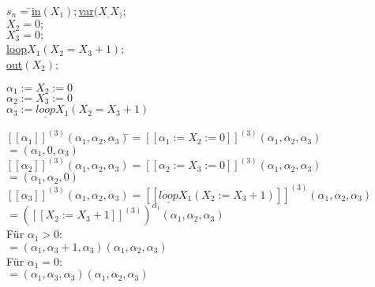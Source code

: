 \documentclass[11pt]{amsart}
\begin{document}
\begin{tabbing}
  $s_n = $\=$ $\underline{in}$ (X_1); $\underline{var}$(X_,X_);$ \\
  \>$ X_2 = 0;$ \\
  \>$ X_3 = 0;$ \\
  \>$ $\underline{loop}$ X_1(X_2 = X_3 + 1);$ \\
  \>$ $\underline{out}$ (X_2);$
\end{tabbing}
\vspace{0.5cm}
$\alpha_1 := X_2 := 0$ \\
$\alpha_2 := X_3 := 0$ \\
$\alpha_3 := \underline{loop} X_1(X_2 = X_3 + 1)$ \\
\begin{tabbing}

$[[\alpha_1]]^{(3)}(\alpha_1,\alpha_2,\alpha_3)$\=$ = [[\alpha_1 := X_2 := 0]]^{(3)}(\alpha_1,\alpha_2,\alpha_3)$ \\
$ $\>$   = (\alpha_1,0,\alpha_3)$ \\[0.3cm]
$[[\alpha_2]]^{(3)}(\alpha_1,\alpha_2,\alpha_3) = [[\alpha_2 := X_3 := 0]]^{(3)}(\alpha_1,\alpha_2,\alpha_3)$ \\
$  $\>$  = (\alpha_1,\alpha_2,0)$ \\[0.3cm]
$[[\alpha_3]]^{(3)}(\alpha_1,\alpha_2,\alpha_3) = [[\underline{loop} X_1(X_2 := X_3 + 1)]]^{(3)}(\alpha_1,\alpha_2,\alpha_3)$ \\
$   $\>$ = ([[X_2 := X_3 + 1]]^{(3)})^{\alpha_1}(\alpha_1,\alpha_2,\alpha_3)$ \\
Für $\alpha_1 > 0$: \\
\> $ = ( \alpha_1 , \alpha_3 + 1, \alpha_3)(\alpha_1,\alpha_2,\alpha_3)$ \\
Für $\alpha_1 = 0$: \\
\> $ = ( \alpha_1 , \alpha_3, \alpha_3)(\alpha_1,\alpha_2,\alpha_3)$ \\
\end{tabbing}
\end{document}

